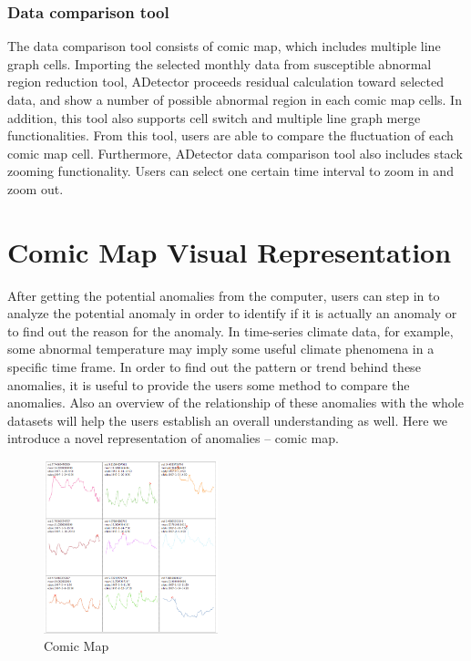 \documentclass{vgtc}                          %
\begin{document}
\subsubsection{Data comparison tool}

The data comparison tool consists of comic map, which includes multiple line graph cells. Importing the selected monthly data from susceptible abnormal region reduction tool, ADetector proceeds residual calculation toward selected data, and show a number of possible abnormal region in each comic map cells. In addition, this tool also supports cell switch and multiple line graph merge functionalities. From this tool, users are able to compare the fluctuation of each comic map cell. Furthermore, ADetector data comparison tool also includes stack zooming functionality. Users can select one certain time interval to zoom in and zoom out. 

\section{Comic Map Visual Representation}

After getting the potential anomalies from the computer, users can step in to analyze the potential anomaly in order to identify if it is actually an anomaly or to find out the reason for the anomaly. In time-series climate data, for example, some abnormal temperature may imply some useful climate phenomena in a specific time frame. In order to find out the pattern or trend behind these anomalies, it is useful to provide the users some method to compare the anomalies. Also an overview of the relationship of these anomalies with the whole datasets will help the users establish an overall understanding as well. Here we introduce a novel representation of anomalies – comic map. 

 \begin{figure}[htb]
	\centering
  \includegraphics[width=0.45\textwidth]{comicMap9Cell.jpg}
  \caption{Comic Map}
\end{figure}
\end{document}
